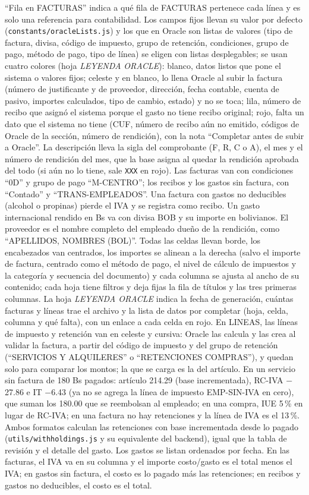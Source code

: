 \documentclass[11pt,letterpaper]{article}
\newcommand{\code}[1]{\nolinkurl{#1}}
\begin{document}
``Fila en FACTURAS'' indica a qué fila de FACTURAS pertenece cada línea y es solo una referencia para contabilidad. Los campos fijos llevan su valor por defecto (\code{constants/oracleLists.js}) y los que en Oracle son listas de valores (tipo de factura, divisa, código de impuesto, grupo de retención, condiciones, grupo de pago, método de pago, tipo de línea) se eligen con listas desplegables; se usan cuatro colores (hoja \emph{LEYENDA ORACLE}): blanco, datos listos que pone el sistema o valores fijos; celeste y en blanco, lo llena Oracle al subir la factura (número de justificante y de proveedor, dirección, fecha contable, cuenta de pasivo, importes calculados, tipo de cambio, estado) y no se toca; lila, número de recibo que asignó el sistema porque el gasto no tiene recibo original; rojo, falta un dato que el sistema no tiene (CUF, número de recibo aún no emitido, códigos de Oracle de la sección, número de rendición), con la nota ``Completar antes de subir a Oracle''. La descripción lleva la sigla del comprobante (F, R, C o A), el mes y el número de rendición del mes, que la base asigna al quedar la rendición aprobada del todo (si aún no lo tiene, sale \code{XXX} en rojo). Las facturas van con condiciones ``0D'' y grupo de pago ``M-CENTRO''; los recibos y los gastos sin factura, con ``Contado'' y ``TRANS-EMPLEADOS''. Una factura con gastos no deducibles (alcohol o propinas) pierde el IVA y se registra como recibo. Un gasto internacional rendido en Bs va con divisa BOB y su importe en bolivianos. El proveedor es el nombre completo del empleado dueño de la rendición, como ``APELLIDOS, NOMBRES (BOL)''. Todas las celdas llevan borde, los encabezados van centrados, los importes se alinean a la derecha (salvo el importe de factura, centrado como el método de pago, el nivel de cálculo de impuestos y la categoría y secuencia del documento) y cada columna se ajusta al ancho de su contenido; cada hoja tiene filtros y deja fijas la fila de títulos y las tres primeras columnas. La hoja \emph{LEYENDA ORACLE} indica la fecha de generación, cuántas facturas y líneas trae el archivo y la lista de datos por completar (hoja, celda, columna y qué falta), con un enlace a cada celda en rojo. En LINEAS, las líneas de impuesto y retención van en celeste y cursiva: Oracle las calcula y las crea al validar la factura, a partir del código de impuesto y del grupo de retención (``SERVICIOS Y ALQUILERES'' o ``RETENCIONES COMPRAS''), y quedan solo para comparar los montos; la que se carga es la del artículo. En un servicio sin factura de 180 Bs pagados: artículo 214.29 (base incrementada), RC-IVA $-$27.86 e IT $-$6.43 (ya no se agrega la línea de impuesto EMP-SIN-IVA en cero), que suman los 180.00 que se reembolsan al empleado; en una compra, IUE 5\,\% en lugar de RC-IVA; en una factura no hay retenciones y la línea de IVA es el 13\,\%. Ambos formatos calculan las retenciones con base incrementada desde lo pagado (\code{utils/withholdings.js} y su equivalente del backend), igual que la tabla de revisión y el detalle del gasto. Los gastos se listan ordenados por fecha. En las facturas, el IVA va en su columna y el importe costo/gasto es el total menos el IVA; en gastos sin factura, el costo es lo pagado más las retenciones; en recibos y gastos no deducibles, el costo es el total.
\end{document}
